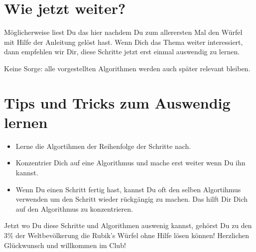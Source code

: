 \section{Wie jetzt weiter?}
Möglicherweise liest Du das hier nachdem Du zum allerersten Mal den Würfel
mit Hilfe der Anleitung gelöst hast. Wenn Dich das Thema weiter interessiert,
dann empfehlen wir Dir, diese Schritte jetzt erst einmal auswendig zu lernen.

Keine Sorge: alle vorgestellten Algorithmen werden auch später relevant bleiben.

\section{Tips und Tricks zum Auswendig lernen}

\begin{itemize}
	\item Lerne die Algortihmen der Reihenfolge der Schritte nach.
	\item Konzentrier Dich auf eine Algorithmus und mache erst weiter
	      wenn Du ihn kannst.
	\item Wenn Du einen Schritt fertig hast, kannst Du oft den selben
	      Algortihmus verwenden um den Schritt wieder rückgängig zu
	      machen. Das hilft Dir Dich auf den Algorithmus zu konzentrieren.
\end{itemize}

Jetzt wo Du diese Schritte und Algorithmen auswenig kannst, gehörst Du zu den
3\% der Weltbevölkerung die Rubik's Würfel ohne Hilfe lösen können!
Herzlichen Glückwunsch und willkommen im Club!
